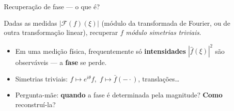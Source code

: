 \documentclass[10pt,aspectratio=169]{beamer}
\newcommand{\F}{\mathcal{F}}
\newcommand{\abs}[1]{\left|#1\right|}
\newcommand{\hl}[1]{{\color{accent}\textbf{#1}}}
\newcommand{\hlb}[1]{{\color{accent2}\textbf{#1}}}
\newcommand{\hlo}[1]{{\color{accent3}\textbf{#1}}}
\begin{document}
\begin{frame}{Recuperação de fase --- o que é?}
  \begin{defbox}
    Dadas as medidas $\abs{\F(f)(\xi)}$ (módulo da transformada de Fourier,
    ou de outra transformação linear), recuperar $f$ \emph{módulo
    simetrias triviais}.
  \end{defbox}
  \vspace{0.4em}
  \begin{itemize}\small
    \setlength{\itemsep}{0.4em}
    \item Em uma medição física, frequentemente só \hlo{intensidades}
          $\abs{\hat f(\xi)}^2$ são observáveis --- a \hl{fase} se perde.
    \item Simetrias triviais: $f \mapsto e^{i\theta} f$,\
          $f \mapsto \bar f(-\cdot)$, translações\ldots
    \item Pergunta-mãe: \hlb{quando} a fase é determinada pela
          magnitude? \hlb{Como} reconstruí-la?
  \end{itemize}
\end{frame}
\end{document}
